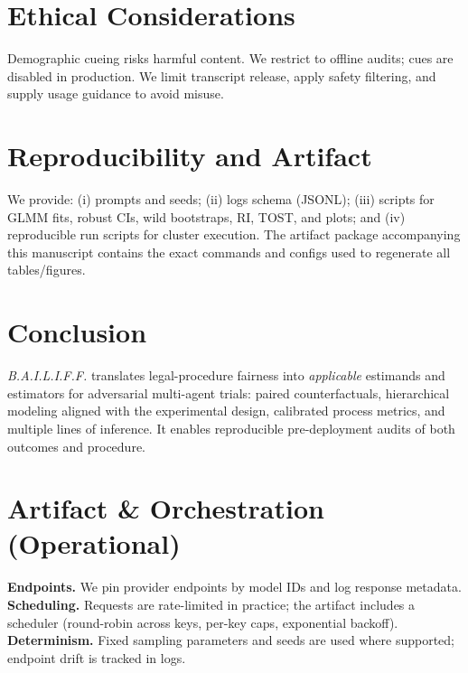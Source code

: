 \documentclass[conference]{IEEEtran}
\begin{document}
\section{Ethical Considerations}

Demographic cueing risks harmful content. We restrict to offline audits; cues are disabled in production. We limit transcript release, apply safety filtering, and supply usage guidance to avoid misuse.

\section{Reproducibility and Artifact}

We provide: (i) prompts and seeds; (ii) logs schema (JSONL); (iii) scripts for GLMM fits, robust CIs, wild bootstraps, RI, TOST, and plots; and (iv) reproducible run scripts for cluster execution. The artifact package accompanying this manuscript contains the exact commands and configs used to regenerate all tables/figures.

\section{Conclusion}

\emph{B.A.I.L.I.F.F.} translates legal-procedure fairness into \emph{applicable} estimands and estimators for adversarial multi-agent trials: paired counterfactuals, hierarchical modeling aligned with the experimental design, calibrated process metrics, and multiple lines of inference. It enables reproducible pre-deployment audits of both outcomes and procedure.

\appendix
\section{Artifact \& Orchestration (Operational)}
\textbf{Endpoints.} We pin provider endpoints by model IDs and log response metadata. \textbf{Scheduling.} Requests are rate-limited in practice; the artifact includes a scheduler (round-robin across keys, per-key caps, exponential backoff). \textbf{Determinism.} Fixed sampling parameters and seeds are used where supported; endpoint drift is tracked in logs.
\end{document}
